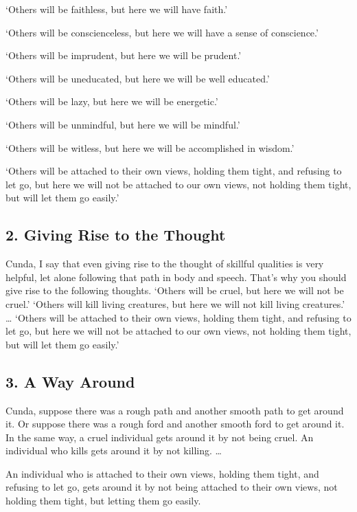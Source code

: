 \documentclass[12pt,openany]{book}%
\begin{document}
‘Others will be faithless, but here we will have faith.’ 

‘Others will be conscienceless, but here we will have a sense of conscience.’ 

‘Others will be imprudent, but here we will be prudent.’ 

‘Others will be uneducated, but here we will be well educated.’ 

‘Others will be lazy, but here we will be energetic.’ 

‘Others will be unmindful, but here we will be mindful.’ 

‘Others will be witless, but here we will be accomplished in wisdom.’ 

‘Others will be attached to their own views, holding them tight, and refusing to let go, but here we will not be attached to our own views, not holding them tight, but will let them go easily.’ 

\subsection*{2. Giving Rise to the Thought }

Cunda, I say that even giving rise to the thought of skillful qualities is very helpful, let alone following that path in body and speech. That’s why you should give rise to the following thoughts. ‘Others will be cruel, but here we will not be cruel.’ ‘Others will kill living creatures, but here we will not kill living creatures.’ … ‘Others will be attached to their own views, holding them tight, and refusing to let go, but here we will not be attached to our own views, not holding them tight, but will let them go easily.’ 

\subsection*{3. A Way Around }

Cunda, suppose there was a rough path and another smooth path to get around it. Or suppose there was a rough ford and another smooth ford to get around it. In the same way, a cruel individual gets around it by not being cruel. An individual who kills gets around it by not killing. … 

An individual who is attached to their own views, holding them tight, and refusing to let go, gets around it by not being attached to their own views, not holding them tight, but letting them go easily. 
\end{document}

